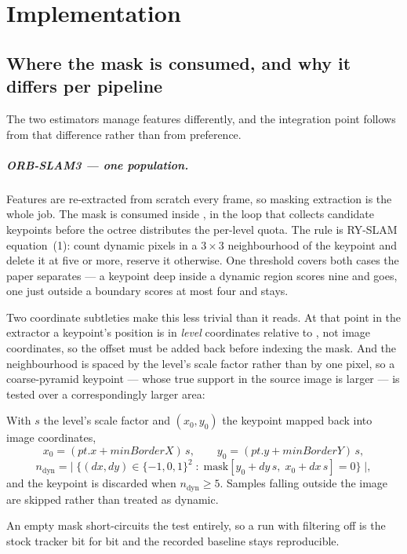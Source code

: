 \documentclass[11pt,a4paper,notitlepage]{report}
\newcommand{\repo}[1]{\texttt{\detokenize{#1}}}
\begin{document}
\chapter{Implementation}

\section{Where the mask is consumed, and why it differs per pipeline}

The two estimators manage features differently, and the integration point
follows from that difference rather than from preference.

\paragraph{ORB-SLAM3 --- one population.}
Features are re-extracted from scratch every frame, so masking extraction is
the whole job. The mask is consumed inside \repo{ORBextractor}, in the loop
that collects candidate keypoints before the octree distributes the per-level
quota. The rule is RY-SLAM equation~(1): count dynamic pixels in a
$3\times3$ neighbourhood of the keypoint and delete it at five or more,
reserve it otherwise. One threshold covers both cases the paper separates ---
a keypoint deep inside a dynamic region scores nine and goes, one just outside
a boundary scores at most four and stays.

Two coordinate subtleties make this less trivial than it reads. At that point
in the extractor a keypoint's position is in \emph{level} coordinates relative
to \repo{(minBorderX, minBorderY)}, not image coordinates, so the offset must
be added back before indexing the mask. And the neighbourhood is spaced by the
level's scale factor rather than by one pixel, so a coarse-pyramid keypoint ---
whose true support in the source image is larger --- is tested over a
correspondingly larger area:

With $s$ the level's scale factor and $(x_0,y_0)$ the keypoint mapped back into
image coordinates,
\[
  x_0 = (\mathit{pt}.x + \mathit{minBorderX})\,s, \qquad
  y_0 = (\mathit{pt}.y + \mathit{minBorderY})\,s,
\]
\[
  n_{\text{dyn}} = \bigl|\;\{(dx,dy) \in \{-1,0,1\}^2 \;:\;
      \mathrm{mask}\left[y_0 + dy\,s,\; x_0 + dx\,s\right] = 0 \}\;\bigr|,
\]
and the keypoint is discarded when $n_{\text{dyn}} \ge 5$. Samples falling
outside the image are skipped rather than treated as dynamic.

An empty mask short-circuits the test entirely, so a run with filtering off is
the stock tracker bit for bit and the recorded baseline stays reproducible.
\end{document}
